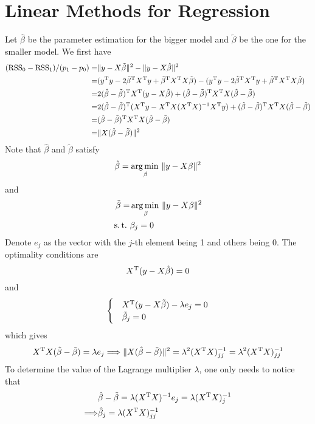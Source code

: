 \section{Linear Methods for Regression}

\begin{sol}
\label{3.1}
Let $\hat{\beta}$ be the parameter estimation for the bigger model and $\tilde{\beta}$ be the one for the smaller model. We first have
\begin{align*}
(\mathrm{RSS}_0-\mathrm{RSS}_1)/(p_1-p_0) = & \|y-X\tilde{\beta}\|^2 - \|y-X\hat{\beta}\|^2 \\
=& (y^{\mathrm{T}}y-2\tilde{\beta}^{\mathrm{T}}X^{\mathrm{T}}y+\tilde{\beta}^{\mathrm{T}}X^{\mathrm{T}}X\tilde{\beta}) - (y^{\mathrm{T}}y-2\hat{\beta}^{\mathrm{T}}X^{\mathrm{T}}y+\hat{\beta}^{\mathrm{T}}X^{\mathrm{T}}X\hat{\beta}) \\
=& 2(\hat{\beta}-\tilde{\beta})^{\mathrm{T}}X^{\mathrm{T}}(y-X\hat{\beta}) + (\hat{\beta}-\tilde{\beta})^{\mathrm{T}}X^{\mathrm{T}}X (\hat{\beta}-\tilde{\beta}) \\
=& 2(\hat{\beta}-\tilde{\beta})^{\mathrm{T}}(X^{\mathrm{T}}y-X^{\mathrm{T}}X(X^{\mathrm{T}}X)^{-1}X^{\mathrm{T}}y) + (\hat{\beta}-\tilde{\beta})^{\mathrm{T}}X^{\mathrm{T}}X (\hat{\beta}-\tilde{\beta}) \\
=& (\hat{\beta}-\tilde{\beta})^{\mathrm{T}}X^{\mathrm{T}}X (\hat{\beta}-\tilde{\beta})\\
=& \|X (\hat{\beta}-\tilde{\beta})\|^2
\end{align*}
Note that $\hat{\beta}$ and $\tilde{\beta}$ satisfy
\[
\hat{\beta}=\operatorname*{arg\,min\,}_\beta\|y-X\beta\|^2
\]
and
\begin{align*}
\tilde{\beta}=&\argmin_\beta\|y-X\beta\|^2\\
\st &\beta_j=0
\end{align*}
Denote $e_j$ as the vector with the $j$-th element being 1 and others being 0. The optimality conditions are
\[
X^{\mathrm{T}}(y-X\hat{\beta})=0
\]
and
\[
\begin{cases}
& X^{\mathrm{T}}(y-X\tilde{\beta})-\lambda e_j=0\\
& \tilde{\beta}_j=0
\end{cases}
\]
which gives
\[
X^{\mathrm{T}}X (\hat{\beta}-\tilde{\beta}) = \lambda e_j \Longrightarrow \|X (\hat{\beta}-\tilde{\beta})\|^2 = \lambda^2 (X^{\mathrm{T}}X)^{-1}_{jj} = \lambda^2 (X^{\mathrm{T}}X)^{-1}_{jj}
\]
To determine the value of the Lagrange multiplier $\lambda$, one only needs to notice that
\begin{align*}
&\hat{\beta}-\tilde{\beta} = \lambda (\Tr{X}X)^{-1} e_j = \lambda (\Tr{X}X)^{-1}_j \\
\Longrightarrow & \hat{\beta}_j = \lambda (\Tr{X}X)^{-1}_{jj} \\

\end{align*}
\end{sol}
